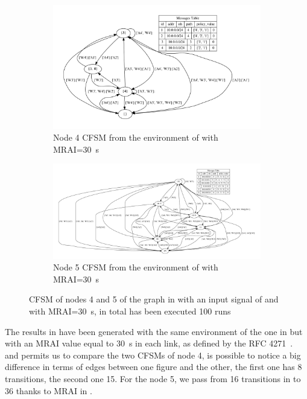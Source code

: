 \begin{figure}[h]
     \centering
     \begin{subfigure}[b]{0.7\textwidth}
         \centering
         \includegraphics[width=\textwidth]{images/fsm/fig_4_4_MRAI30.pdf}
		 \caption{Node \num{4} \ac{CFSM} from the environment of  with \ac{MRAI}=\SI{30}{\second}}
         \label{fig:fsm_node4_MRAI}
     \end{subfigure}
     \hfill
     \begin{subfigure}[b]{0.9\textwidth}
         \centering
         \includegraphics[width=\textwidth]{images/fsm/fig_4_5_MRAI30.pdf}
		 \caption{Node \num{5} \ac{CFSM} from the environment of  with \ac{MRAI}=\SI{30}{\second}}
         \label{fig:fsm_node5_MRAI}
     \end{subfigure}
		\caption{\ac{CFSM} of nodes \num{4} and \num{5} of the graph in
			 with an input signal of  and with
			\ac{MRAI}=\SI{30}{\second}, in total has been executed \num{100} runs}
        \label{fig:fsm_griffin_fig4_MRAI}
\end{figure}

The results in  have been generated with the same
environment of the one in  but with an \ac{MRAI} value
equal to \SI{30}{\second} in each link, as defined by the \ac{RFC} \num{4271}~\cite{rfc4271}.
 and  permits us to compare the two
\ac{CFSM}s of node \num{4}, is possible to notice a big difference in terms of edges
between one figure and the other, the first one has \num{8} transitions, the
second one \num{15}.
For the node \num{5}, we pass from \num{16} transitions in 
to \num{36} thanks to \ac{MRAI} in .

